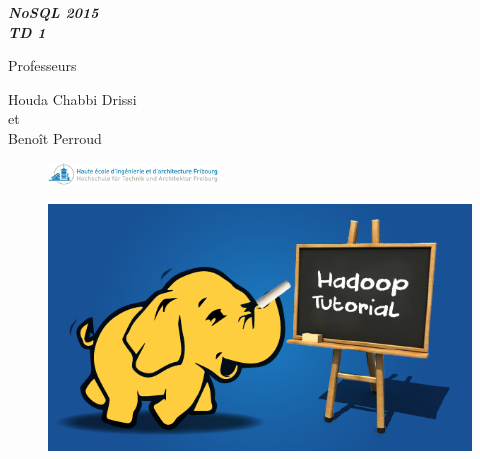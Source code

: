 \documentclass[11pt]{article}
\begin{document}

\begin{center}
\Huge{\bf \emph{NoSQL 2015 \\ TD 1}} %
\end{center}

\begin{center}
Professeurs 

\bigskip 


Houda Chabbi Drissi \\et \\Benoît Perroud \\
\end{center}

\begin{center}
\begin{figure}[h!]

  \centering
    \includegraphics[width=0.4\textwidth]{Images/Logo_HEIA-FR_site}
     
\end{figure}
\end{center}



\begin{figure}[h!]

  \centering
    \includegraphics[width=1\textwidth]{Images/Hadoop-tutorial.png}
     
\end{figure}

\bigskip
\end{document}
